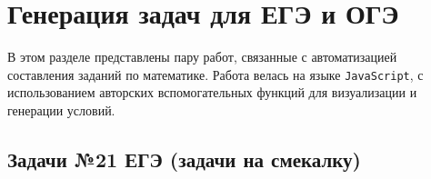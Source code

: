 \section{Генерация задач для ЕГЭ и ОГЭ}

В этом разделе представлены пару работ, связанные с автоматизацией составления заданий по математике. 
Работа велась на языке \texttt{JavaScript}, с использованием авторских вспомогательных функций для визуализации и генерации условий.
\subsection{Задачи №21 ЕГЭ (задачи на смекалку)}

